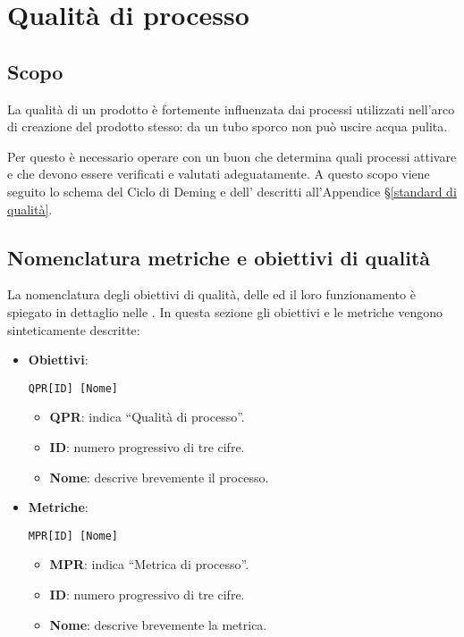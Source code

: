 \section{Qualità di processo}\label{qualità di processo}

\subsection{Scopo}
La qualità di un prodotto è fortemente influenzata dai processi utilizzati nell'arco di creazione del prodotto stesso: da un tubo sporco non può uscire acqua pulita.

Per questo è necessario operare con un buon  che
determina quali processi attivare e che devono essere verificati e valutati adeguatamente. A questo scopo viene seguito lo schema del Ciclo di Deming e dell' descritti all'Appendice \S\ref{standard di qualità}.

\subsection{Nomenclatura metriche e obiettivi di qualità}  \label{nomenclatura}
La nomenclatura degli obiettivi di qualità, delle  ed il loro funzionamento è spiegato in dettaglio nelle \NdP. In questa sezione gli obiettivi e le metriche vengono sinteticamente descritte:

	\begin{itemize}
		\item \textbf{Obiettivi}: 
		
		\begin{center}
			\texttt{QPR[ID] [Nome]}
		\end{center} 
		
		\begin{itemize}
			\item \textbf{QPR}: indica ``Qualità di processo''.
			\item \textbf{ID}: numero progressivo di tre cifre.
			\item \textbf{Nome}: descrive brevemente il processo.
		\end{itemize}
		
		\item \textbf{Metriche}:
		
		\begin{center}
			\texttt{MPR[ID] [Nome]}
		\end{center}
		
		\begin{itemize}
			\item \textbf{MPR}: indica ``Metrica di processo''.
			\item \textbf{ID}: numero progressivo di tre cifre.
			\item \textbf{Nome}: descrive brevemente la metrica.
		\end{itemize}
		
	\end{itemize}




